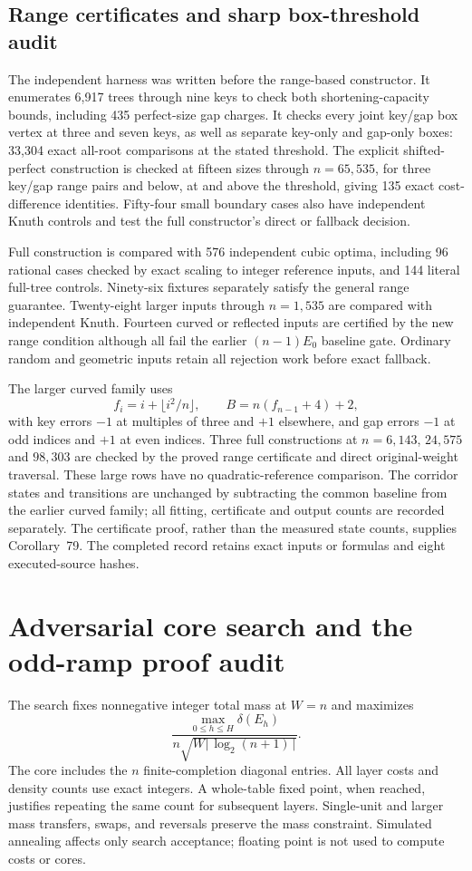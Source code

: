 \documentclass[11pt]{article}
\begin{document}
\subsection{Range certificates and sharp box-threshold audit}
\label{app:shape-range}
The independent harness was written before the range-based constructor.
It enumerates 6,917 trees through nine keys to check both shortening-capacity
bounds, including 435 perfect-size gap charges. It checks every joint
key/gap box vertex at three and seven keys, as well as separate key-only
and gap-only boxes: 33,304 exact all-root comparisons at the stated threshold.
The explicit shifted-perfect construction is checked at fifteen sizes
through $n=65{,}535$, for three key/gap range pairs and below, at and above
the threshold, giving 135 exact cost-difference identities. Fifty-four
small boundary cases also have independent Knuth controls and test the full
constructor's direct or fallback decision.

Full construction is compared with 576 independent cubic optima, including
96 rational cases checked by exact scaling to integer reference inputs,
and 144 literal full-tree controls. Ninety-six fixtures separately satisfy
the general range guarantee. Twenty-eight larger inputs through $n=1{,}535$
are compared with independent Knuth. Fourteen curved or reflected inputs
are certified by the new range condition although all fail the earlier
$(n-1)E_0$ baseline gate. Ordinary random and geometric inputs retain
all rejection work before exact fallback.

The larger curved family uses
\[
 f_i=i+\lfloor i^2/n\rfloor,\qquad B=n(f_{n-1}+4)+2,
\]
with key errors $-1$ at multiples of three and $+1$ elsewhere, and gap
errors $-1$ at odd indices and $+1$ at even indices. Three full constructions
at $n=6{,}143$, $24{,}575$ and $98{,}303$ are checked by the proved range
certificate and direct original-weight traversal. These large rows have
no quadratic-reference comparison. The corridor states and transitions
are unchanged by subtracting the common baseline from the earlier curved
family; all fitting, certificate and output counts are recorded separately.
The certificate proof, rather than the measured state counts, supplies
Corollary~79. The completed record retains exact
inputs or formulas and eight executed-source hashes.

\section{Adversarial core search and the odd-ramp proof audit}
\label{app:core-search}
The search fixes nonnegative integer total mass at $W=n$ and maximizes
\[
 \frac{\max_{0\le h\le H}\delta(E_h)}{n\sqrt{W\lceil\log_2(n+1)\rceil}}.
\]
The core includes the $n$ finite-completion diagonal entries. All layer
costs and density counts use exact integers. A whole-table fixed point,
when reached, justifies repeating the same count for subsequent layers.
Single-unit and larger mass transfers, swaps, and reversals preserve the
mass constraint. Simulated annealing affects only search acceptance;
floating point is not used to compute costs or cores.
\end{document}
